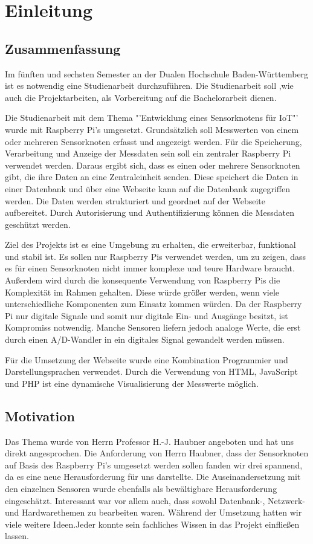 \chapter{Einleitung}
\section{Zusammenfassung}
Im fünften und sechsten Semester an der Dualen Hochschule Baden-Württemberg ist es notwendig eine Studienarbeit durchzuführen. Die Studienarbeit soll ,wie auch die Projektarbeiten, als Vorbereitung auf die Bachelorarbeit dienen. 

Die Studienarbeit mit dem Thema "'Entwicklung eines Sensorknotens für IoT"' wurde mit Raspberry Pi's umgesetzt. Grundsätzlich soll Messwerten von einem oder mehreren Sensorknoten erfasst und angezeigt werden. Für die Speicherung, Verarbeitung und Anzeige der Messdaten sein soll ein zentraler Raspberry Pi verwendet werden. Daraus ergibt sich, dass es einen oder mehrere Sensorknoten gibt, die ihre Daten an eine Zentraleinheit senden. Diese speichert die Daten in einer Datenbank und über eine Webseite kann auf die Datenbank zugegriffen werden. Die Daten werden strukturiert und geordnet auf der Webseite aufbereitet. Durch Autorisierung und Authentifizierung können die Messdaten geschützt werden.

Ziel des Projekts ist es eine Umgebung zu erhalten, die erweiterbar, funktional und stabil ist. Es sollen nur Raspberry Pis verwendet werden, um zu zeigen, dass es für einen Sensorknoten nicht immer komplexe und teure Hardware braucht. Außerdem wird durch die konsequente Verwendung von Raspberry Pis die Komplexität im Rahmen gehalten. Diese würde größer werden, wenn viele unterschiedliche Komponenten zum Einsatz kommen würden. Da der Raspberry Pi nur digitale Signale und somit nur digitale Ein- und Ausgänge besitzt, ist Kompromiss notwendig. Manche Sensoren liefern jedoch analoge Werte, die erst durch einen \ac{A/D-Wandler} in ein digitales Signal gewandelt werden müssen. 

Für die Umsetzung der Webseite wurde eine Kombination Programmier und Darstellungsprachen verwendet. Durch die Verwendung von \ac{HTML}, JavaScript und \ac{PHP} ist eine dynamische Visualisierung der Messwerte möglich.

\section{Motivation}
Das Thema wurde von Herrn Professor H.-J. Haubner angeboten und hat uns direkt angesprochen. Die Anforderung von Herrn Haubner, dass der Sensorknoten auf Basis des Raspberry Pi's umgesetzt werden sollen fanden wir drei spannend, da es eine neue Herausforderung für uns darstellte. Die Auseinandersetzung mit den einzelnen Sensoren wurde ebenfalls als bewältigbare Herausforderung eingeschätzt. Interessant war vor allem auch, dass sowohl Datenbank-, Netzwerk- und Hardwarethemen zu bearbeiten waren. Während der Umsetzung hatten wir viele weitere Ideen.Jeder konnte sein fachliches Wissen in das Projekt einfließen lassen. 
